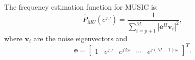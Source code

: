 The frequency estimation function for MUSIC is:
\begin{equation}
\hat P_{MU}(e^{j \omega}) = \frac{1}{\sum_{i=p+1}^{M} |\mathbf{e}^{H} \mathbf{v}_i|^2},
\end{equation}
where $\mathbf{v}_i$ are the noise eigenvectors and
\begin{equation}
\mathbf{e} = \begin{bmatrix}1 & e^{j \omega} & e^{j 2 \omega} & \cdots & e^{j (M-1) \omega}\end{bmatrix}^T.
\end{equation}
